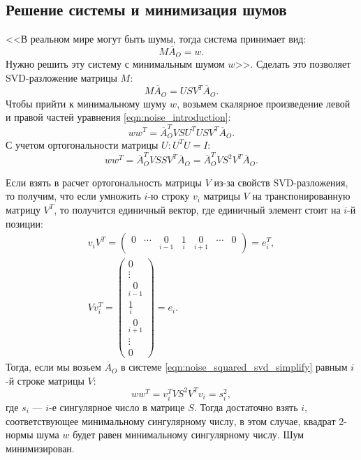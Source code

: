 \documentclass[12pt, a4paper]{article}
\begin{document}
\subsection{Решение системы и минимизация шумов}
<<В реальном мире могут быть шумы, тогда система принимает вид:
\begin{equation}
M \overline{A}_{O} = w.
\label{eqn:noise_introduction}
\end{equation}
Нужно решить эту систему с минимальным шумом $w$\cite{dlt_temugeb}>>. Сделать это позволяет
SVD-разложение матрицы $M$:
\begin{equation}
    M \overline{A}_O = U S V^T \overline{A}_O.
\label{eqn:dlt-two-cameras-matrix}
\end{equation}
Чтобы прийти к минимальному шуму $w$, возьмем скалярное произведение левой и правой частей уравнения \eqref{eqn:noise_introduction}:
\begin{equation}
    w w^T =   \overline{A}_O^T V S U^T U S V^T \overline{A}_O.
\end{equation}
С учетом ортогональности матрицы $U: U^T U = I$:
\begin{equation}
    w w^T = \overline{A}_O^T V S S V^T \overline{A}_O = 
    \overline{A}_O^T V S^2 V^T \overline{A}_O.
\label{eqn:noise_squared_svd_simplify}
\end{equation}

Если взять в расчет ортогональность матрицы $V$ из-за свойств SVD-разложения,
то получим, что если умножить $i$-ю строку $v_i$ матрицы $V$ на
транспонированную матрицу $V^T$, то получится единичный вектор, где единичный
элемент стоит на $i$-й позиции:
\begin{equation}
\begin{gathered}
    v_i V^T = \begin{pmatrix}
        0 & \cdots & \underset{i-1}{0} & \underset{i}{1} & \underset{i+1}{0} & \cdots & 0
    \end{pmatrix} = e_i^T, \\
    V v_i^T = \begin{pmatrix}
        0 \\
        \vdots \\
        \underset{i-1}{0}\\
        \underset{i}{1}\\
        \underset{i+1}{0}\\
        \vdots\\
        0
    \end{pmatrix} = e_i.
\end{gathered}
\end{equation}
Тогда, если мы возьем $\overline{A}_O$ в системе
\eqref{eqn:noise_squared_svd_simplify} равным $i$-й строке матрицы $V$:
\begin{equation}
    w w^T = v_i^T V S^2 V^T v_i = s_i^2,
\end{equation}
где $s_i$ --- $i$-е сингулярное число в матрице $S$. Тогда достаточно взять $i$,
соответствующее минимальному сингулярному числу, в этом случае, квадрат 2-нормы
шума $w$ будет равен минимальному сингулярному числу. Шум минимизирован.
\end{document}

